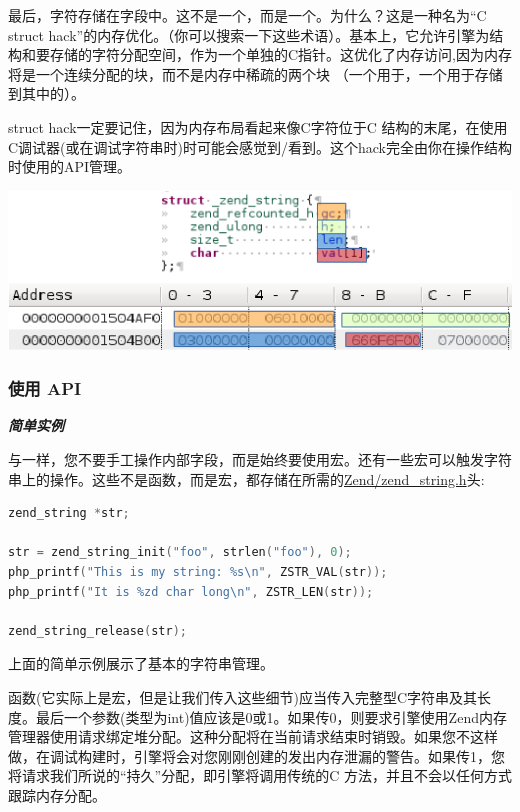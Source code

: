 最后，字符存储在字段中。这不是一个，而是一个。为什么？这是一种名为“C struct hack”的内存优化。（你可以搜索一下这些术语）。基本上，它允许引擎为结构和要存储的字符分配空间，作为一个单独的C指针。这优化了内存访问,因为内存将是一个连续分配的块，而不是内存中稀疏的两个块
（一个用于，一个用于存储到其中的）。

struct hack一定要记住，因为内存布局看起来像C字符位于C 结构的末尾，在使用C调试器(或在调试字符串时)时可能会感觉到/看到。这个hack完全由你在操作结构时使用的API管理。

\includegraphics{images/zend_string_memory_layout.png} 

\subsubsection{使用 API}

\textbf{\textit{简单实例}}

与一样，您不要手工操作内部字段，而是始终要使用宏。还有一些宏可以触发字符串上的操作。这些不是函数，而是宏，都存储在所需的\href{https://github.com/php/php-src/blob/PHP-7.0/Zend/zend_string.h}{Zend/zend\_string.h}头:

\begin{lstlisting}[language=c]
zend_string *str;

str = zend_string_init("foo", strlen("foo"), 0);
php_printf("This is my string: %s\n", ZSTR_VAL(str));
php_printf("It is %zd char long\n", ZSTR_LEN(str));

zend_string_release(str);
\end{lstlisting}

上面的简单示例展示了基本的字符串管理。

函数(它实际上是宏，但是让我们传入这些细节)应当传入完整型C字符串及其长度。最后一个参数(类型为int)值应该是0或1。如果传0，则要求引擎使用Zend内存管理器使用请求绑定堆分配。这种分配将在当前请求结束时销毁。如果您不这样做，在调试构建时，引擎将会对您刚刚创建的发出内存泄漏的警告。如果传1，您将请求我们所说的“持久”分配，即引擎将调用传统的C 方法，并且不会以任何方式跟踪内存分配。

